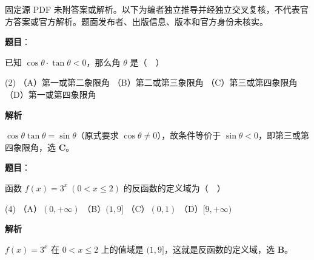 

\begin{gktip}
固定源 PDF 未附答案或解析。以下为编者独立推导并经独立交叉复核，不代表官方答案或官方解析。题面发布者、出版信息、版本和官方身份未核实。
\end{gktip}


\begin{answer}

\textbf{题目}：

已知 $\cos\theta\cdot\tan\theta<0$，那么角 $\theta$ 是（　）

\begin{gkopts}(2)
\task （A）第一或第二象限角
\task （B）第二或第三象限角
\task （C）第三或第四象限角
\task （D）第一或第四象限角
\end{gkopts}

\textbf{解析}

$\cos\theta\tan\theta=\sin\theta$（原式要求 $\cos\theta\ne0$），故条件等价于 $\sin\theta<0$，即第三或第四象限角，选 \textbf{C}。


\end{answer}
\begin{answer}

\textbf{题目}：

函数 $f(x)=3^x\ (0<x\leq 2)$ 的反函数的定义域为（　）

\begin{gkopts}(4)
\task （A）$(0,+\infty)$
\task （B）$(1,9]$
\task （C）$(0,1)$
\task （D）$[9,+\infty)$
\end{gkopts}

\textbf{解析}

$f(x)=3^x$ 在 $0<x\le2$ 上的值域是 $(1,9]$，这就是反函数的定义域，选 \textbf{B}。

\gkanswer{答案：B，$(1,9]$}

\end{answer}
